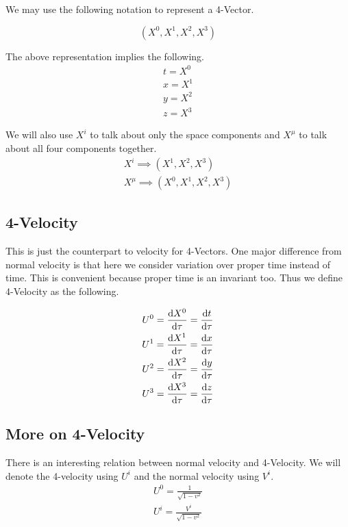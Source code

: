 \documentclass[16pt]{scrartcl}
\numberwithin{equation}{section}
\theoremstyle{plain}
\theoremstyle{definition}
\begin{document}
We may use the following notation to represent a 4-Vector.

\begin{equation}
    (X^0, X^1, X^2, X^3)
    \label{eq:4-vector}
\end{equation}

The above representation implies the following.
\begin{gather}
    t = X^0\\
    x = X^1\\
    y = X^2\\
    z = X^3
    \label{eq:4-vector-comps}
\end{gather}

We will also use $X^i$ to talk about only the space components and $X^\mu$ to talk about all four components together.
\begin{gather}
    X^i \implies (X^1, X^2, X^3)\\
    X^\mu \implies (X^0, X^1, X^2, X^3)
    \label{eq:4-vec-notation}
\end{gather}

\subsection{4-Velocity}

This is just the counterpart to velocity for 4-Vectors. One major difference from normal velocity is that here we consider variation over proper time instead of time. This is convenient because proper time is an invariant too. Thus we define 4-Velocity as the following.

\begin{gather}
    U^0 = \dv{X^0}{\tau} = \dv{t}{\tau}\\
    U^1 = \dv{X^1}{\tau} = \dv{x}{\tau}\\
    U^2 = \dv{X^2}{\tau} = \dv{y}{\tau}\\
    U^3 = \dv{X^3}{\tau} = \dv{z}{\tau}
    \label{eq:4-velocity}
\end{gather}

\subsection{More on 4-Velocity}

There is an interesting relation between normal velocity and 4-Velocity. We will denote the 4-velocity using $U^i$ and the normal velocity using $V^i$.
\begin{gather}
    U^0 = \frac{1}{\sqrt{1 - v^2}}\\
    U^i = \frac{V^i}{\sqrt{1 - v^2}}
    \label{4vel-normalvel}
\end{gather}
\end{document}
